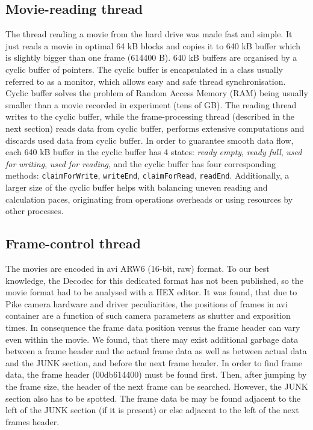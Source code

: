 \documentclass[preprint,review,12pt,dvips]{elsarticle}
\begin{document}
\subsection{Movie-reading thread} The thread reading a movie from the hard drive was made fast and simple. It just reads
a movie in optimal 64 kB blocks and copies it to 640 kB buffer which is slightly bigger than one frame (614400 B). 640 kB
buffers are organised by a cyclic buffer of pointers. The cyclic buffer is encapsulated in a class usually referred to as
a monitor, which allows easy and safe thread synchronisation. Cyclic buffer solves the problem of Random Access Memory
(RAM) being usually smaller than a movie recorded in experiment (tens of GB). The reading thread writes to the cyclic
buffer, while the frame-processing thread (described in the next section) reads data from cyclic buffer, performs
extensive computations and discards used data from cyclic buffer. In order to guarantee smooth data flow, each 640 kB
buffer in the cyclic buffer has 4 states: \textit{ready empty}, \textit{ready full}, \textit{used for writing},
\textit{used for reading}, and the cyclic buffer has four corresponding methods: \texttt{claimForWrite},
\texttt{writeEnd}, \texttt{claimForRead}, \texttt{readEnd}. Additionally, a larger size of the cyclic buffer helps with
balancing uneven reading and calculation paces, originating from operations overheads or using resources by other
processes.

\subsection{Frame-control thread} The movies are encoded in avi ARW6 (16-bit, raw) format. To our best knowledge, the
Decodec for this dedicated format has not been published, so the movie format had to be analysed with a HEX editor. It was
found, that due to Pike camera hardware and driver peculiarities, the positions of frames in avi container are a function
of such camera parameters as shutter and exposition times. In consequence the frame data position versus the frame header
can vary even within the movie. We found, that there may exist additional garbage data between a frame header and the
actual frame data as well as between actual data and the JUNK section, and before the next frame header. In order to find
frame data, the frame header (00db614400) must be found first. Then, after jumping by the frame size, the header of the
next frame can be searched. However, the JUNK section also has to be spotted. The frame data be may be found adjacent to
the left of the JUNK section (if it is present) or else adjacent to the left of the next frames header.
\end{document}
